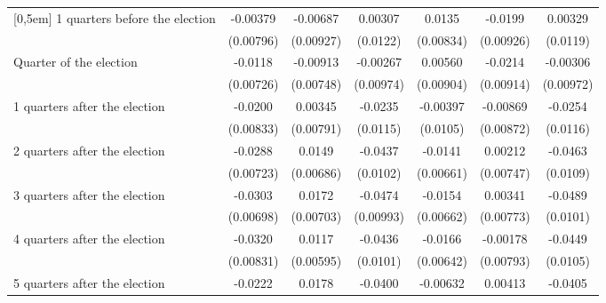 \begin{table}[!ht]
\begin{tabular}{l*{6}{c}}
[0,5em]
 1 quarters before the election&    -0.00379         &    -0.00687         &     0.00307         &      0.0135         &     -0.0199\sym{*}  &     0.00329         \\
                    &   (0.00796)         &   (0.00927)         &    (0.0122)         &   (0.00834)         &   (0.00926)         &    (0.0119)         \\
[0,5em]
Quarter of the election&     -0.0118         &    -0.00913         &    -0.00267         &     0.00560         &     -0.0214\sym{*}  &    -0.00306         \\
                    &   (0.00726)         &   (0.00748)         &   (0.00974)         &   (0.00904)         &   (0.00914)         &   (0.00972)         \\
[0,5em]
 1 quarters after the election&     -0.0200\sym{*}  &     0.00345         &     -0.0235\sym{*}  &    -0.00397         &    -0.00869         &     -0.0254\sym{*}  \\
                    &   (0.00833)         &   (0.00791)         &    (0.0115)         &    (0.0105)         &   (0.00872)         &    (0.0116)         \\
[0,5em]
 2 quarters after the election&     -0.0288\sym{***}&      0.0149\sym{*}  &     -0.0437\sym{***}&     -0.0141\sym{*}  &     0.00212         &     -0.0463\sym{***}\\
                    &   (0.00723)         &   (0.00686)         &    (0.0102)         &   (0.00661)         &   (0.00747)         &    (0.0109)         \\
[0,5em]
 3 quarters after the election&     -0.0303\sym{***}&      0.0172\sym{*}  &     -0.0474\sym{***}&     -0.0154\sym{*}  &     0.00341         &     -0.0489\sym{***}\\
                    &   (0.00698)         &   (0.00703)         &   (0.00993)         &   (0.00662)         &   (0.00773)         &    (0.0101)         \\
[0,5em]
 4 quarters after the election&     -0.0320\sym{***}&      0.0117         &     -0.0436\sym{***}&     -0.0166\sym{**} &    -0.00178         &     -0.0449\sym{***}\\
                    &   (0.00831)         &   (0.00595)         &    (0.0101)         &   (0.00642)         &   (0.00793)         &    (0.0105)         \\
[0,5em]
 5 quarters after the election&     -0.0222\sym{**} &      0.0178         &     -0.0400\sym{**} &    -0.00632         &     0.00413         &     -0.0405\sym{**} \\

\end{tabular}
\end{table}
